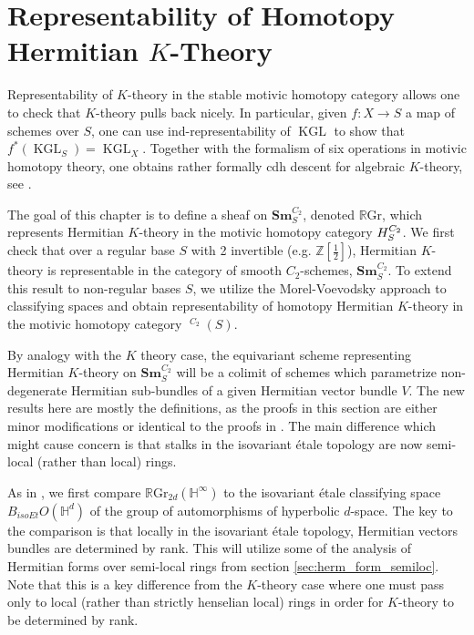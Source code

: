 \documentclass[edeposit,fullpage]{uiucthesis2009}
\newcommand{\Z}{\mathbb Z}
\newcommand{\mbb}{\mathbb}
\newcommand{\RGr}{\mathbb R\mathrm{Gr}}
\newcommand{\Sm}[1]{\mathbf{Sm}_{#1}}
\newcommand{\mothom}{\mathbf{H}}
\DeclareMathOperator{\KGL}{KGL}
\DeclareMathOperator{\HH}{\underline{H}}
\theoremstyle{plain}
\numberwithin{lemma}{section}
\theoremstyle{definition}
\begin{document}
\chapter{Representability of Homotopy Hermitian $K$-Theory}\label{chap:herm_grass}


Representability of $K$-theory in the stable motivic homotopy category
allows one to check that $K$-theory pulls back nicely. In particular,
given $f : X \rightarrow S$ a map of schemes over $S$, one can use
ind-representability of $\KGL$ to show that
$f^*(\KGL_S) = \KGL_X$. Together with the formalism of six operations
in motivic homotopy theory, one obtains rather formally cdh descent for algebraic
$K$-theory, see \cite{DenRep}.

The goal of
this chapter is to define a sheaf on $\Sm{S}^{C_2}$, denoted $\RGr$, which represents
Hermitian $K$-theory in the motivic homotopy category $\mathcal
\mothom_S^{C_2}$. We first check that over a regular base $S$ with 2 invertible
(e.g. $\Z[\frac{1}{2}]$), Hermitian $K$-theory is representable in the
category of smooth $C_2$-schemes, $\Sm{S}^{C_2}$. To
extend this result to non-regular bases $S$, we utilize the
Morel-Voevodsky approach to classifying spaces and obtain
representability of homotopy Hermitian $K$-theory in the motivic homotopy category $\HH^{C_2}(S)$.

By analogy with the $K$ theory case, the equivariant scheme
representing Hermitian $K$-theory on $\Sm{S}^{C_2}$ will be a colimit of schemes
which parametrize non-degenerate Hermitian sub-bundles of a given
Hermitian vector bundle $V$. The new results here are mostly the
definitions, as the proofs in this section are either
minor modifications or identical to the proofs in \cite{SchTri}. The
main difference which might cause concern is that stalks in the
isovariant \'etale topology are now semi-local (rather than
local) rings. 

As in \cite{SchTri}, we first compare $\RGr_{2d}(\mbb H^\infty)$ to the isovariant \'etale
classifying space $B_{isoEt}O(\mbb H^{d})$ of the group of automorphisms of
hyperbolic $d$-space. The key to the comparison is that locally in the
isovariant \'etale topology, Hermitian vectors bundles are determined
by rank. This will utilize some of the analysis of
Hermitian forms over semi-local rings from section
\ref{sec:herm_form_semiloc}. Note that this is a key difference from
the $K$-theory case where one must pass only to local (rather than
strictly henselian local) rings in order for $K$-theory to be
determined by rank. 
\end{document}
